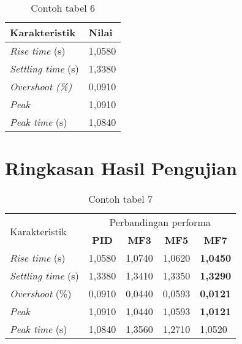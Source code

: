 \lipsum[1]

\begin{table}[H]
    \centering
    \caption{Contoh tabel 6}
    \label{t karPID}
    \begin{tabular}{ll}
        \hline
        Karakteristik & Nilai \\ \hline
        \textit{Rise time} (s)     & 1,0580     \\
        \textit{Settling time} (s) & 1,3380     \\
        \textit{Overshoot (\%)}    & 0,0910     \\
        \textit{Peak}              & 1,0910     \\
        \textit{Peak time} (s)     & 1,0840     \\ \hline
    \end{tabular}
\end{table}

\section{Ringkasan Hasil Pengujian}
\lipsum[1]

\begin{table}[H]
    \centering
    \caption{Contoh tabel 7}
    \label{t perbandinganRespon}
    \begin{tabular}{lllll}
        \hline
        \multirow{2}{*}{Karakteristik} & \multicolumn{4}{c}{Perbandingan performa} \\ \cline{2-5} 
        & \multicolumn{1}{c}{\textbf{PID}} & \multicolumn{1}{c}{\textbf{MF3}} & \multicolumn{1}{c}{\textbf{MF5}} & \multicolumn{1}{c}{\textbf{MF7}} \\ \hline
        \textit{Rise time} (s)  & 1,0580  & 1,0740  & 1,0620    & \textbf{1,0450} \\
        \textit{Settling time} (s) & 1,3380 & 1,3410  & 1,3350  & \textbf{1,3290} \\
        \textit{Overshoot} (\%) & 0,0910 & 0,0440  & 0,0593     & \textbf{0,0121} \\
        \textit{Peak} & 1,0910 & 1,0440 & 1,0593 & \textbf{1,0121} \\
        \textit{Peak time} (s) & 1,0840 & 1,3560  & 1,2710      & 1,0520  \\ \hline
    \end{tabular}
\end{table}